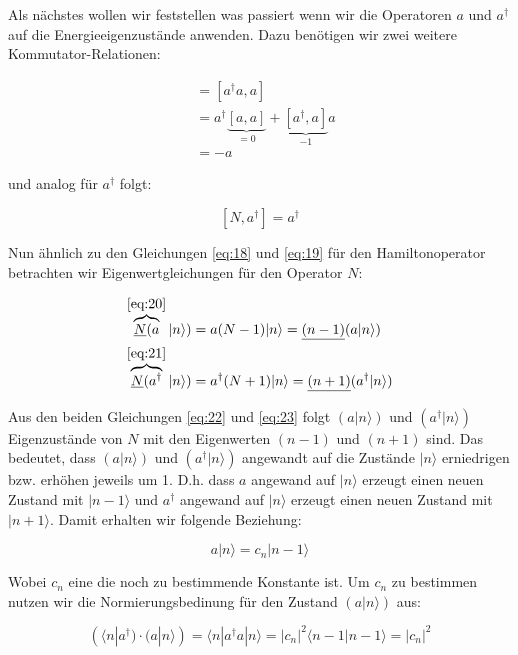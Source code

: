 Als nächstes wollen wir feststellen was passiert wenn wir die Operatoren \(a\) und \(a^\dagger\) auf die Energieeigenzustände anwenden. Dazu benötigen wir zwei weitere Kommutator-Relationen:

\begin{align}
  [N,a] &= [a^\dagger a,a] \\
&= a^\dagger\underbrace{[a,a]}_{=0} + \underbrace{[a^\dagger,a]}_{-1}a \\
&= - a\label{eq:20}
\end{align}

und analog für \(a^\dagger\) folgt:

\begin{equation}
  \label{eq:21}
  [N,a^\dagger] = a^\dagger
\end{equation}

Nun ähnlich zu den Gleichungen \eqref{eq:18} und \eqref{eq:19} für den Hamiltonoperator betrachten wir  Eigenwertgleichungen für den Operator \(N\):


\begin{align}
 \overbrace{\underline{N}(a}^{\eqref{eq:20}}|n\rangle ) &= a(N-1)|n\rangle  = \underline{(n-1)}(a|n\rangle ) \label{eq:22}\\
  \overbrace{\underline{N}(a^\dagger}^{\eqref{eq:21}}|n\rangle ) &= a^\dagger(N+1)|n\rangle  = \underline{(n+1)}(a^\dagger|n\rangle )\label{eq:23}
\end{align}

Aus den beiden Gleichungen \eqref{eq:22} und \eqref{eq:23} folgt  \((a|n\rangle) \) und \((a^\dagger|n\rangle)\) Eigenzustände von \(N\) mit den Eigenwerten \((n-1)\) und  \((n+ 1)\) sind. Das bedeutet, dass \((a|n\rangle) \) und \((a^\dagger|n\rangle)\) angewandt auf die Zustände \(|n\rangle \) erniedrigen bzw. erhöhen jeweils um 1. D.h. dass \(a\) angewand auf \(|n\rangle \) erzeugt einen neuen Zustand mit \(|n-1\rangle \) und \(a^\dagger\) angewand auf \(|n\rangle \) erzeugt einen neuen Zustand mit \(|n+1\rangle \). Damit erhalten wir folgende Beziehung:

\begin{equation}
  \label{eq:24}
  a|n\rangle = c_{n}|n-1\rangle 
\end{equation}

Wobei \(c_n\) eine die noch zu bestimmende Konstante ist. Um \(c_n\) zu bestimmen nutzen wir die Normierungsbedinung für den Zustand \((a|n\rangle )\) aus:

\begin{equation}
  \label{eq:25}
  (\langle n| a^\dagger )\cdot(a|n\rangle ) = \langle n| a^\dagger a | n\rangle  = |c_n|^2 \langle n-1|n-1\rangle  = |c_n|^2
\end{equation}

